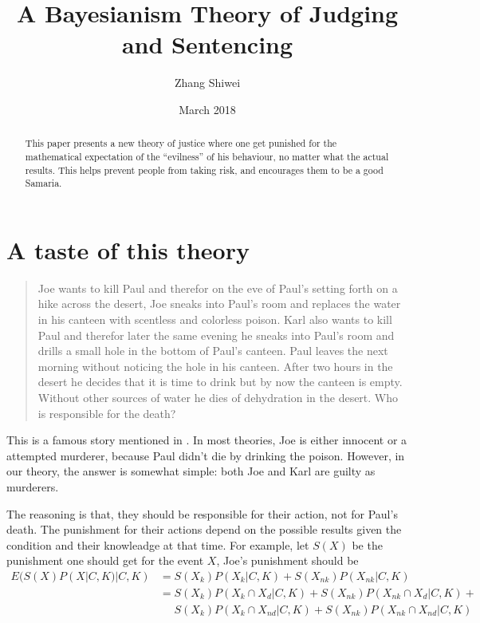 \documentclass{manuscript}
\title{A Bayesianism Theory of Judging and Sentencing}
\author{Zhang Shiwei}
\date{March 2018}
\begin{document}
    \maketitle

    \begin{abstract}
        This paper presents a new theory of justice where one get punished for the mathematical expectation of the
        ``evilness'' of his behaviour, no matter what the actual results. This helps prevent people from taking risk,
        and encourages them to be a good Samaria.
    \end{abstract}

    \section{A taste of this theory}

    \begin{quotation}
        Joe wants to kill Paul and therefor on the eve of Paul's setting forth on a hike across the desert, Joe sneaks
        into Paul's room and replaces the water in his canteen with scentless and colorless poison. Karl also wants to
        kill Paul and therefor later the same evening he sneaks into Paul's room and drills a small hole in the bottom
        of Paul's canteen. Paul leaves the next morning without noticing the hole in his canteen. After two hours in the
        desert he decides that it is time to drink but by now the canteen is empty. Without other sources of water he dies
        of dehydration in the desert. Who is responsible for the death?
    \end{quotation}

    This is a famous story mentioned in \cite{fletcher1998basic}. In most theories, Joe is either innocent or a attempted
    murderer, because Paul didn't die by drinking the poison. However, in our theory, the answer is somewhat simple: both
    Joe and Karl are guilty as murderers.

    The reasoning is that, they should be responsible for their action, not for Paul's death. The punishment for their
    actions depend on the possible results given the condition and their knowleadge at that time. For example, let $S(X)$
    be the punishment one should get for the event $X$, Joe's punishment should be
    $$\begin{aligned}
        E(S(X)P(X|C, K)|C, K) &= S(X_k)P(X_k|C,K) + S(X_{nk})P(X_{nk}|C,K) \\
                              &= S(X_k)P(X_k \cap X_d|C,K) + S(X_{nk})P(X_{nk} \cap X_d|C,K) + {} \\
                              &\phantom{{}={}} S(X_k)P(X_k \cap X_{nd}|C,K) + S(X_{nk})P(X_{nk} \cap X_{nd}|C,K)
    \end{aligned}$$
\end{document}
